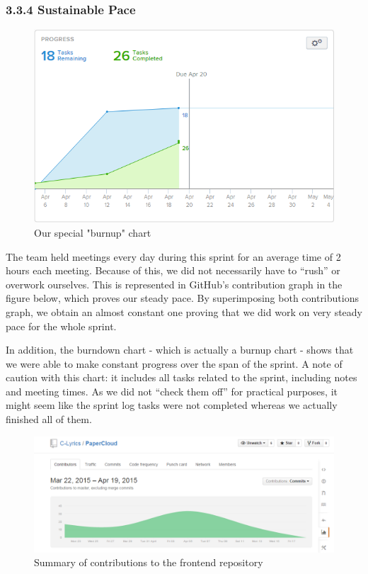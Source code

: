 \documentclass[]{article}
\begin{document}
\subsubsection{3.3.4 Sustainable Pace}\label{sustainable-pace}

\begin{figure}[htbp]
\centering
\includegraphics{images/burndown.png}
\caption{Our special "burnup" chart}
\end{figure}

The team held meetings every day during this sprint for an average time
of 2 hours each meeting. Because of this, we did not necessarily have to
``rush'' or overwork ourselves. This is represented in GitHub's
contribution graph in the figure below, which proves our steady pace. By
superimposing both contributions graph, we obtain an almost constant one
proving that we did work on very steady pace for the whole sprint.

In addition, the burndown chart - which is actually a burnup chart -
shows that we were able to make constant progress over the span of the
sprint. A note of caution with this chart: it includes all tasks related
to the sprint, including notes and meeting times. As we did not ``check
them off'' for practical purposes, it might seem like the sprint log
tasks were not completed whereas we actually finished all of them.

\begin{figure}[htbp]
\centering
\includegraphics{images/contributions_front.png}
\caption{Summary of contributions to the frontend repository}
\end{figure}
\end{document}

